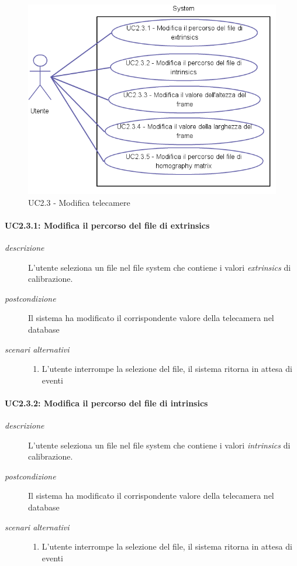  \begin{figure}[htpb]
\centering
\includegraphics[scale=0.4]{./images/uc23.png}
\caption{UC2.3 - Modifica telecamere}
\label{fig:uc23}
\end{figure} 

\paragraph{UC2.3.1: Modifica il percorso del file di extrinsics} \label{sec:uc2.3.1}
\begin{description}
 \item[\em{descrizione}] L'utente seleziona un file nel file system che contiene i valori \textit{extrinsics} di calibrazione.
   \item[\em{postcondizione}] Il sistema ha modificato il corrispondente valore della telecamera nel database
  \item[\em{scenari alternativi}] \mbox{}
  \begin{enumerate}
  \item L'utente interrompe la selezione del file, il sistema ritorna in attesa di eventi
  \end{enumerate}
 \end{description}

\paragraph{UC2.3.2: Modifica il percorso del file di intrinsics} \label{sec:uc2.3.2}
\begin{description}
 \item[\em{descrizione}] L'utente seleziona un file nel file system che contiene i valori \textit{intrinsics} di calibrazione.
   \item[\em{postcondizione}] Il sistema ha modificato il corrispondente valore della telecamera nel database
     \item[\em{scenari alternativi}] \mbox{}
  \begin{enumerate}
  \item L'utente interrompe la selezione del file, il sistema ritorna in attesa di eventi
  \end{enumerate}
 \end{description}


